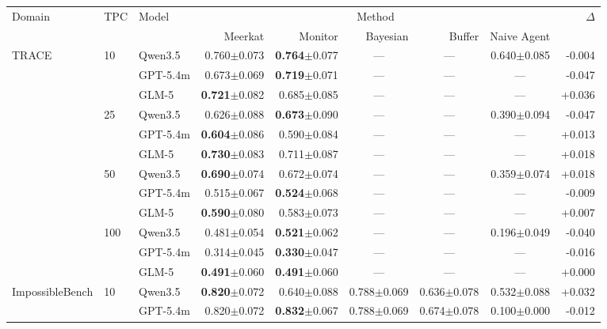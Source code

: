 \documentclass{article} %
\newcommand{\res}[2]{#1{\scriptsize$\pm$#2}}
\newcommand{\bestres}[2]{\textbf{#1}{\scriptsize$\pm$#2}}
\newcommand{\na}{\multicolumn{1}{c}{---}}
\begin{document}
\begin{table}[t]
  \centering
  \tiny
  \begin{tabular}{@{}lllrrrrrr@{}}
    \toprule
    \multirow{2}{*}{Domain} & \multirow{2}{*}{TPC} & \multirow{2}{*}{Model}
      & \multicolumn{5}{c}{Method} & \multirow{2}{*}{$\Delta$} \\
    \cmidrule(lr){4-8}
      & & & Meerkat & Monitor & Bayesian & Buffer & Naive Agent & \\
    \midrule
    \multirow{12}{*}{TRACE} & \multirow{3}{*}{10} & Qwen3.5 & \res{0.760}{0.073} & \bestres{0.764}{0.077} & \na & \na & \res{0.640}{0.085} & -0.004 \\
     & & GPT-5.4m & \res{0.673}{0.069} & \bestres{0.719}{0.071} & \na & \na & \na & -0.047 \\
     & & GLM-5 & \bestres{0.721}{0.082} & \res{0.685}{0.085} & \na & \na & \na & +0.036 \\
    \cmidrule(lr){2-9}
     & \multirow{3}{*}{25} & Qwen3.5 & \res{0.626}{0.088} & \bestres{0.673}{0.090} & \na & \na & \res{0.390}{0.094} & -0.047 \\
     & & GPT-5.4m & \bestres{0.604}{0.086} & \res{0.590}{0.084} & \na & \na & \na & +0.013 \\
     & & GLM-5 & \bestres{0.730}{0.083} & \res{0.711}{0.087} & \na & \na & \na & +0.018 \\
    \cmidrule(lr){2-9}
     & \multirow{3}{*}{50} & Qwen3.5 & \bestres{0.690}{0.074} & \res{0.672}{0.074} & \na & \na & \res{0.359}{0.074} & +0.018 \\
     & & GPT-5.4m & \res{0.515}{0.067} & \bestres{0.524}{0.068} & \na & \na & \na & -0.009 \\
     & & GLM-5 & \bestres{0.590}{0.080} & \res{0.583}{0.073} & \na & \na & \na & +0.007 \\
    \cmidrule(lr){2-9}
     & \multirow{3}{*}{100} & Qwen3.5 & \res{0.481}{0.054} & \bestres{0.521}{0.062} & \na & \na & \res{0.196}{0.049} & -0.040 \\
     & & GPT-5.4m & \res{0.314}{0.045} & \bestres{0.330}{0.047} & \na & \na & \na & -0.016 \\
     & & GLM-5 & \bestres{0.491}{0.060} & \bestres{0.491}{0.060} & \na & \na & \na & +0.000 \\
    \midrule
    \multirow{8}{*}{ImpossibleBench} & \multirow{2}{*}{10} & Qwen3.5 & \bestres{0.820}{0.072} & \res{0.640}{0.088} & \res{0.788}{0.069} & \res{0.636}{0.078} & \res{0.532}{0.088} & +0.032 \\
     & & GPT-5.4m & \res{0.820}{0.072} & \bestres{0.832}{0.067} & \res{0.788}{0.069} & \res{0.674}{0.078} & \res{0.100}{0.000} & -0.012 \\

\end{tabular}
\end{table}
\end{document}
